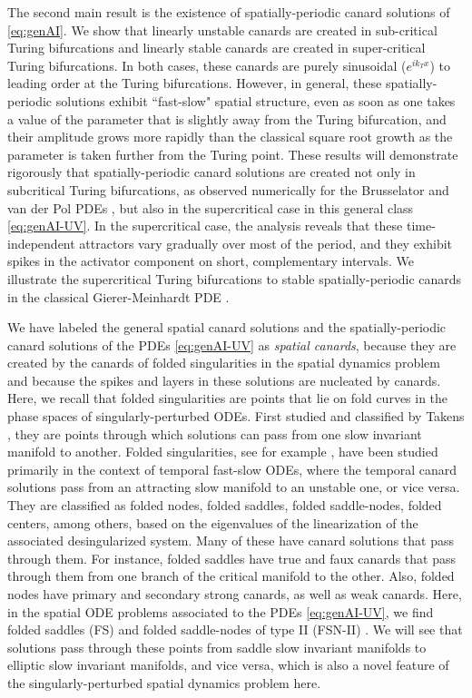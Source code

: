 \documentclass[11pt]{article}
\numberwithin{equation}{section}
\begin{document}
The second main result is the existence of spatially-periodic canard solutions of \eqref{eq:genAI}. 
We show that linearly unstable canards are created in sub-critical Turing bifurcations and linearly stable canards are created in super-critical Turing bifurcations. 
In both cases, these canards are purely sinusoidal ($e^{ik_Tx}$) to leading order at the Turing bifurcations.
However, in general, these spatially-periodic solutions exhibit ``fast-slow" spatial structure, even as soon as one takes a value of the parameter that is slightly away from the Turing bifurcation, and their amplitude grows more rapidly than the classical square root growth as the parameter is taken further from the Turing point.
These results will demonstrate rigorously that spatially-periodic canard solutions are created not only in subcritical Turing bifurcations, as observed numerically for the Brusselator and van der Pol PDEs \cite{JDKV2026,VDK2025}, but also in the supercritical case in this general class \eqref{eq:genAI-UV}.
In the supercritical case, the analysis reveals that these time-independent attractors vary gradually over most of the period, and they
exhibit spikes in the activator component on short, complementary intervals.
We illustrate the supercritical Turing bifurcations to stable spatially-periodic canards in the classical Gierer-Meinhardt PDE \cite{EK2005,GM-orig,M1989,W1997}.

We have labeled the general spatial canard solutions and the spatially-periodic canard solutions of the PDEs \eqref{eq:genAI-UV} as {\it spatial canards}, because they are created by the canards of folded singularities in the spatial dynamics problem and because the spikes and layers in these solutions are nucleated by canards.
Here, we recall that folded singularities are points that lie on fold curves in the phase spaces of singularly-perturbed ODEs.
First studied and classified by Takens \cite{T1976}, they are points through which solutions can pass from one slow invariant manifold to another.
Folded singularities, see for example \cite{B1983,BKW2006,DR1996,KS2001,KW2010,MW2017,RRW2015,RKW2008,SW2001,VW2015}, have been studied primarily in the context of temporal fast-slow ODEs,
where the temporal canard solutions \cite{BCDD1981,D1984,DR1996,E1983,Moehlis,RKZE2003} 
pass from an attracting slow manifold to an unstable one, or vice versa.
They are classified as folded nodes, folded saddles, folded saddle-nodes, folded centers, among others, based on the eigenvalues of the linearization of the associated desingularized system.
Many of these have canard solutions that pass through them.
For instance, folded saddles have true and faux canards
that pass through them from one branch of the critical manifold to the other.
Also, folded nodes have primary and secondary strong canards, as well as weak canards.
Here, in the spatial ODE problems associated to the PDEs \eqref{eq:genAI-UV}, we find folded saddles (FS) and folded saddle-nodes of type II (FSN-II) \cite{KW2010,MW2017,SW2001}.
We will see that solutions pass through these points from saddle slow invariant manifolds to elliptic slow invariant manifolds, and vice versa, which is also a novel feature of the singularly-perturbed spatial dynamics problem here.
\end{document}

